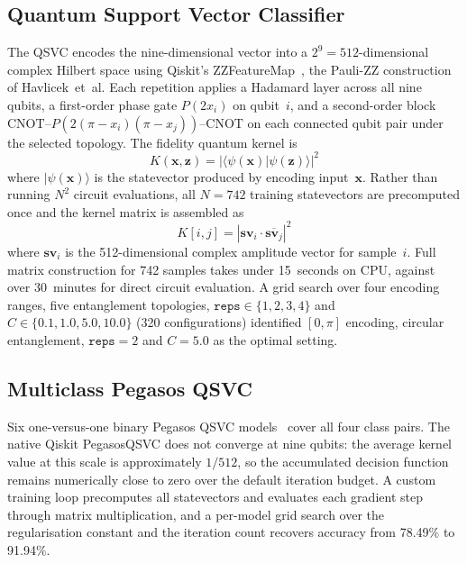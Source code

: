 \documentclass[10pt,conference]{IEEEtran}
\begin{document}
\subsection{Quantum Support Vector Classifier}

The QSVC encodes the nine-dimensional vector into a
$2^9\!=\!512$-dimensional complex Hilbert space using Qiskit's
ZZFeatureMap~\cite{havlicek2019}, the Pauli-ZZ construction of
Havlicek~et~al. Each repetition applies a Hadamard layer across all nine
qubits, a first-order phase gate $P(2x_i)$ on qubit~$i$, and a
second-order block
$\mathrm{CNOT}$--$P\!\left(2(\pi-x_i)(\pi-x_j)\right)$--$\mathrm{CNOT}$
on each connected qubit pair under the selected topology. The fidelity
quantum kernel is
\begin{equation}
K(\mathbf{x},\mathbf{z}) = |\langle\psi(\mathbf{x})|\psi(\mathbf{z})\rangle|^2
\label{eq:kernel}
\end{equation}
where $|\psi(\mathbf{x})\rangle$ is the statevector produced by
encoding input~$\mathbf{x}$. Rather than running $N^2$ circuit
evaluations, all $N\!=\!742$ training statevectors are precomputed once
and the kernel matrix is assembled as
\begin{equation}
K[i,j] = |\mathbf{sv}_i \cdot \overline{\mathbf{sv}_j}|^2
\label{eq:kmatrix}
\end{equation}
where $\mathbf{sv}_i$ is the 512-dimensional complex amplitude vector
for sample~$i$. Full matrix construction for 742 samples takes under
15~seconds on CPU, against over 30~minutes for direct circuit
evaluation. A grid search over four encoding ranges, five entanglement
topologies, $\texttt{reps}\in\{1,2,3,4\}$ and
$C\in\{0.1,1.0,5.0,10.0\}$ (320 configurations) identified $[0,\pi]$
encoding, circular entanglement, $\texttt{reps}\!=\!2$ and $C\!=\!5.0$
as the optimal setting.

\subsection{Multiclass Pegasos QSVC}

Six one-versus-one binary Pegasos QSVC models~\cite{pegasos} cover all
four class pairs. The native Qiskit PegasosQSVC does not converge at
nine qubits: the average kernel value at this scale is approximately
$1/512$, so the accumulated decision function remains numerically close
to zero over the default iteration budget. A custom training loop
precomputes all statevectors and evaluates each gradient step through
matrix multiplication, and a per-model grid search over the
regularisation constant and the iteration count recovers accuracy from
78.49\% to 91.94\%.
\end{document}
